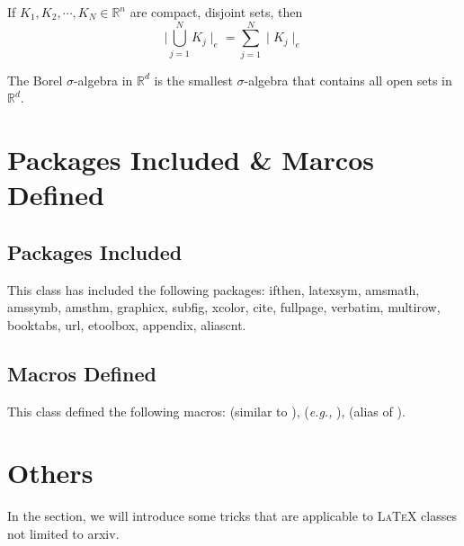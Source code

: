 \documentclass[11pt]{../arxiv}
\begin{document}
\begin{corollary}\label{coro: compact}
If $K_1, K_2,\cdots,K_N\in\mathbb{R}^n$ are compact, disjoint sets, then 
$$
\mid \bigcup_{j=1}^{N}K_j \mid_{e} = \sum_{j=1}^N\mid K_j\mid_e
$$
\end{corollary}

\begin{definition}\label{def: borel}
The Borel $\sigma$-algebra in $\mathbb{R}^d$ is the smallest $\sigma$-algebra that contains all open sets in $\mathbb{R}^d$.
\end{definition}

\section{Packages Included \& Marcos Defined}\label{sec: packages-and-macros}

\subsection{Packages Included}\label{subsec: packages}

This class has included the following packages: {\code ifthen, latexsym, amsmath, amssymb, amsthm, graphicx, subfig, xcolor, 
cite, fullpage, verbatim, multirow, booktabs, url, etoolbox, appendix, aliascnt}. 

\subsection{Macros Defined}\label{subsec: macros}

This class defined the following macros: \texttt{\code} (similar to \texttt{\it}), 
\texttt{\email} ({\it e.g.,} \texttt{}), \texttt{\authormark} (alias of \texttt{\footnotemark}). 



\appendix

\section{Others}\label{appsec: others}

In the section, we will introduce some tricks that are applicable to \textsc{LaTeX} classes not limited to {\code arxiv}. 
\end{document}
